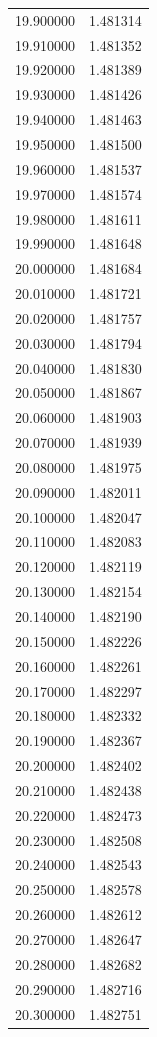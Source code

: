 \begin{tabular}{rr}
19.900000 & 1.481314 \\
19.910000 & 1.481352 \\
19.920000 & 1.481389 \\
19.930000 & 1.481426 \\
19.940000 & 1.481463 \\
19.950000 & 1.481500 \\
19.960000 & 1.481537 \\
19.970000 & 1.481574 \\
19.980000 & 1.481611 \\
19.990000 & 1.481648 \\
20.000000 & 1.481684 \\
20.010000 & 1.481721 \\
20.020000 & 1.481757 \\
20.030000 & 1.481794 \\
20.040000 & 1.481830 \\
20.050000 & 1.481867 \\
20.060000 & 1.481903 \\
20.070000 & 1.481939 \\
20.080000 & 1.481975 \\
20.090000 & 1.482011 \\
20.100000 & 1.482047 \\
20.110000 & 1.482083 \\
20.120000 & 1.482119 \\
20.130000 & 1.482154 \\
20.140000 & 1.482190 \\
20.150000 & 1.482226 \\
20.160000 & 1.482261 \\
20.170000 & 1.482297 \\
20.180000 & 1.482332 \\
20.190000 & 1.482367 \\
20.200000 & 1.482402 \\
20.210000 & 1.482438 \\
20.220000 & 1.482473 \\
20.230000 & 1.482508 \\
20.240000 & 1.482543 \\
20.250000 & 1.482578 \\
20.260000 & 1.482612 \\
20.270000 & 1.482647 \\
20.280000 & 1.482682 \\
20.290000 & 1.482716 \\
20.300000 & 1.482751 \\

\end{tabular}

